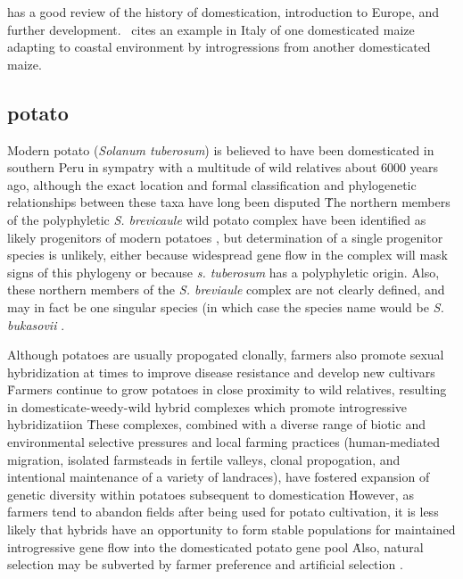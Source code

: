 \documentclass[11pt]{article}
\begin{document}
\cite{bitocchi2009introgression} has a good review of the history of domestication, introduction to Europe, and further development.
\cite{hammer1987collection}\ cites an example in Italy of one domesticated maize adapting to coastal environment by introgressions from another domesticated maize.










\subsection*{potato}

Modern potato (\emph{Solanum tuberosum}) is believed to have been domesticated in southern Peru in sympatry with a multitude of wild relatives about 6000 years ago, although the exact location and formal classification and phylogenetic relationships between these taxa have long been disputed \cite{huaman2002reclassification, spooner2005single, pickersgill1977origins, hawkes1988evolution}\.
The northern members of the polyphyletic \emph{S. brevicaule} wild potato complex have been identified as likely progenitors of modern potatoes \cite{correll1962potato}, but determination of a single progenitor species is unlikely, either because widespread gene flow in the complex will mask signs of this phylogeny or because \emph{s. tuberosum} has a polyphyletic origin.
Also, these northern members of the \emph{S. breviaule} complex are not clearly defined, and may in fact be one singular species (in which case the species name would be \emph{S. bukasovii} \cite{spooner2005single}.

Although potatoes are usually propogated clonally, farmers also promote sexual hybridization at times to improve disease resistance and develop new cultivars \cite{quiros1992increase}\.
Farmers continue to grow potatoes in close proximity to wild relatives, resulting in domesticate-weedy-wild hybrid complexes which promote introgressive hybridizatiion \cite{rabinowitz1990high, johns1987relationships, linder1987diversity}\.
These complexes, combined with a diverse range of biotic and environmental selective pressures and local farming practices (human-mediated migration, isolated farmsteads in fertile valleys, clonal propogation, and intentional maintenance of a variety of landraces), have fostered expansion of genetic diversity within potatoes subsequent to domestication \cite{brush1995potato}\.
However, as farmers tend to abandon fields after being used for potato cultivation, it is less likely that hybrids have an opportunity to form stable populations for maintained introgressive gene flow into the domesticated potato gene pool \cite{brush1995potato}\.
Also, natural selection may be subverted by farmer preference and artificial selection \cite{brush1981dynamics}.
\end{document}
